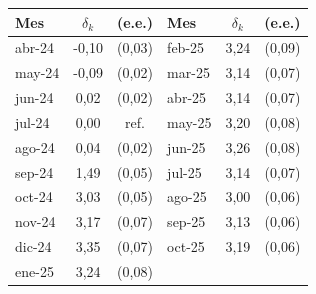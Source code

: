 \begin{tabular}{lcc|lcc}
\toprule
Mes & $\delta_k$ & (e.e.) & Mes & $\delta_k$ & (e.e.) \\
\midrule
abr-24 & -0,10 & (0,03) & feb-25 & 3,24 & (0,09) \\
may-24 & -0,09 & (0,02) & mar-25 & 3,14 & (0,07) \\
jun-24 & 0,02 & (0,02) & abr-25 & 3,14 & (0,07) \\
jul-24 & 0,00 & ref. & may-25 & 3,20 & (0,08) \\
ago-24 & 0,04 & (0,02) & jun-25 & 3,26 & (0,08) \\
sep-24 & 1,49 & (0,05) & jul-25 & 3,14 & (0,07) \\
oct-24 & 3,03 & (0,05) & ago-25 & 3,00 & (0,06) \\
nov-24 & 3,17 & (0,07) & sep-25 & 3,13 & (0,06) \\
dic-24 & 3,35 & (0,07) & oct-25 & 3,19 & (0,06) \\
ene-25 & 3,24 & (0,08) &  & &  \\
\bottomrule
\end{tabular}
